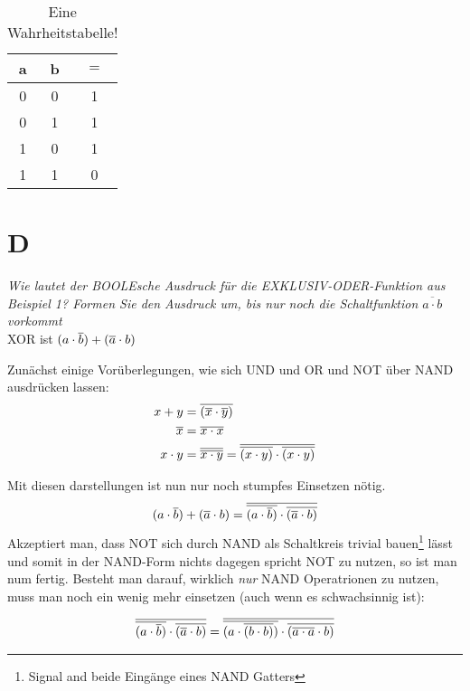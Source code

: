 \begin{table}[H]
\centering
\begin{tabular}{cc|c}
a&b&$=$\\\hline
0&0&1\\
0&1&1\\
1&0&1\\
1&1&0\\
\end{tabular}
\caption{Eine Wahrheitstabelle!}
\label{tab:truths}
\end{table}


\section{D}
\textit{Wie lautet der BOOLEsche Ausdruck für die
EXKLUSIV-ODER-Funktion aus Beispiel 1? Formen
Sie den Ausdruck um, bis nur noch die Schaltfunktion $\overline{a \cdot b}$ vorkommt}\\


XOR ist $(a \cdot \overline{b}) + (\overline{a} \cdot b)$

Zunächst einige Vorüberlegungen, wie sich UND und OR und NOT über NAND ausdrücken lassen:
\begin{align}
    x + y &= \overline{(\overline{x} \cdot \overline{y})} \label{eq:OR_to_NAND}\\
    \overline{x} &= \overline{x \cdot x} \label{eq:NOT_to_NAND}\\
    x \cdot y &= \overline{\overline{x \cdot y}} = \overline{\overline{(x \cdot y)} \cdot \overline{(x \cdot y)}} \label{eq:AND_to_NAND}
\end{align}

Mit diesen darstellungen ist nun nur noch stumpfes Einsetzen nötig.
\begin{align}
    (a \cdot \overline{b}) + (\overline{a} \cdot b)
    = \overline{\overline{(a \cdot \overline{b})} \cdot \overline{(\overline{a} \cdot b)}}
\end{align}
Akzeptiert man, dass NOT sich durch NAND als Schaltkreis trivial bauen\footnote{Signal and beide Eingänge eines NAND Gatters} lässt und somit in der NAND-Form nichts dagegen spricht NOT zu nutzen, so ist man num fertig. Besteht man darauf, wirklich \textit{nur} NAND Operatrionen zu nutzen, muss man noch ein wenig mehr einsetzen (auch wenn es schwachsinnig ist):

\begin{align}
    \overline{\overline{(a \cdot \overline{b})} \cdot \overline{(\overline{a} \cdot b)}}
    = \overline{\overline{(a \cdot \overline{(b \cdot b)})} \cdot \overline{(\overline{a \cdot a} \cdot b)}}
\end{align}


